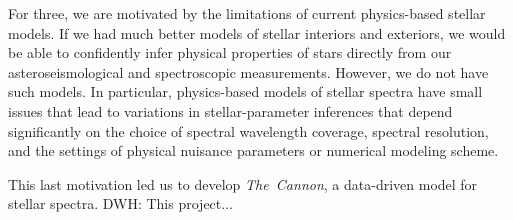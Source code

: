 \documentclass[12pt, preprint]{aastex}
\newcommand{\project}[1]{\textsl{#1}}
\newcommand{\thecannon}{\project{The~Cannon}}
\begin{document}
For three, we are motivated by the limitations of current physics-based
stellar models.
If we had much better models of stellar interiors and exteriors, we would be
able to confidently infer physical properties of stars directly from our
asteroseismological and spectroscopic measurements.
However, we do not have such models.
In particular, physics-based models of stellar spectra have small issues that
lead to variations in stellar-parameter inferences that depend
significantly on the choice of spectral wavelength coverage, spectral
resolution, and the settings of physical nuisance parameters or
numerical modeling scheme.

This last motivation led us to develop \thecannon, a data-driven model
for stellar spectra.
DWH: This project...
\end{document}
